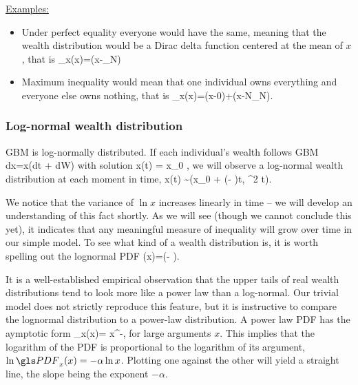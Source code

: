 \underline{Examples:}
\begin{itemize}
\item Under perfect equality everyone would have the same, meaning that the wealth
distribution would be a Dirac delta function centered at the mean of $x$, that is
\be
\PDF_x(x)=\delta(x-_N)
\ee
\item
Maximum inequality would mean that one individual owns everything
and everyone else owns nothing, that is
\be 
\PDF_x(x)=\delta(x-0)+\delta(x-N_N).
\ee
\end{itemize}

\subsubsection{Log-normal wealth distribution}
GBM is log-normally distributed. If each individual's wealth follows GBM 
\be
dx=x(\mu dt + \sigma dW)
\ee
with solution 
\be
x(t) = x_0 \exp{},
\ee
we will observe a log-normal wealth distribution at each moment in time,
\be
\ln x(t) \sim {}\left(\ln x_0 + \left(\mu - \right)t, \sigma^2 t\right).
\ee


We notice that the variance of $\ln x$ increases linearly in time -- 
we will develop an understanding of this fact shortly. As we will see 
(though we cannot conclude this yet), it indicates that any meaningful 
measure of inequality will grow over time in our simple model. 
To see what kind of a wealth distribution  is, it is worth 
spelling out the lognormal PDF
\be
\PDF(x)=\exp\left(- \right).
\ee

It is a well-established empirical observation \cite{Newman2005} that the upper tails of 
real wealth distributions tend to look more like a power law than a log-normal. Our trivial model does not
strictly reproduce this feature, but it is instructive to compare the lognormal distribution
to a power-law distribution. A power law PDF has the aymptotic form 
\be
\PDF_x(x)= x^{-\alpha},
\ee
for large arguments $x$. This implies that the logarithm of the PDF is proportional 
to the logarithm of its argument, $\ln \PDF_x(x) = -\alpha \ln x$. Plotting
one against the other will yield a straight line, the slope being the exponent $-\alpha$. 

